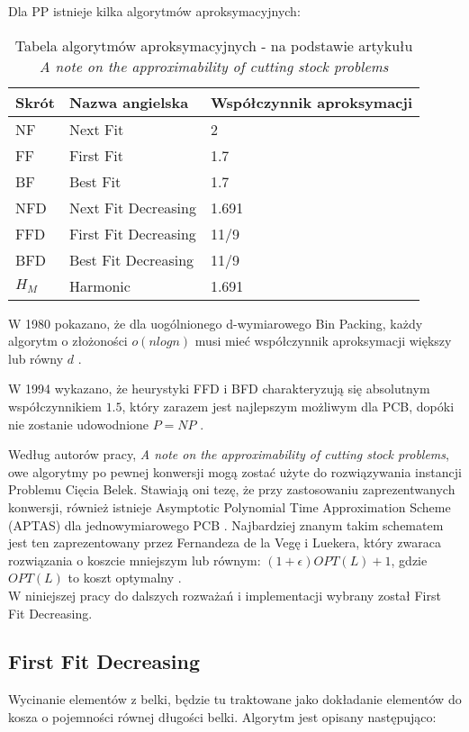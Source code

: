 Dla PP istnieje kilka algorytmów aproksymacyjnych: 

\begin{table}[!h]
\begin{center}
	\begin{tabular}{ |p{3cm}||p{5cm}|p{3cm}|  }
		\hline
		Skrót & Nazwa angielska & Współczynnik aproksymacji\\
		\hline
		NF   & Next Fit & 2\\
		FF & First Fit & 1.7\\
		BF & Best Fit & 1.7\\
		NFD & Next Fit Decreasing &  1.691\\
		FFD & First Fit Decreasing & 11/9\\
		BFD & Best Fit Decreasing & 11/9\\
		$H_M$ & Harmonic & 1.691\\	
		\hline
	\end{tabular}
	\caption{\label{APPROX_RATIOS}Tabela algorytmów aproksymacyjnych - na podstawie artykułu \textit{A note on the approximability of cutting stock problems} }
\end{center}
\end{table}

W 1980 pokazano, że dla uogólnionego d-wymiarowego Bin Packing, każdy algorytm o złożoności $o(nlogn)$ musi mieć współczynnik aproksymacji większy lub równy $d$ \cite{APPROX_RATIO}.

W 1994 wykazano, że heurystyki FFD i BFD charakteryzują się absolutnym współczynnikiem $1.5$, który zarazem jest najlepszym możliwym dla PCB, dopóki nie zostanie udowodnione $P=NP$ \cite{WORST_CASE_APPROX}.

Według autorów pracy, \textit{A note on the approximability of cutting stock problems}, owe algorytmy po pewnej konwersji mogą zostać użyte do rozwiązywania instancji Problemu Cięcia Belek. Stawiają oni tezę, że przy zastosowaniu zaprezentwanych konwersji, również istnieje Asymptotic Polynomial Time Approximation Scheme (APTAS) dla jednowymiarowego PCB \cite{NOTE_ON_APPROX}.
Najbardziej znanym takim schematem jest ten zaprezentowany przez Fernandeza de la Vegę i Luekera, który zwaraca rozwiązania o koszcie mniejszym lub równym: $(1+\epsilon)OPT(L) + 1$, gdzie $OPT(L)$ to koszt optymalny \cite{APTAS}. \\

W niniejszej pracy do dalszych rozważań i implementacji wybrany został First Fit Decreasing.

\subsection{First Fit Decreasing}  \label{approx_pseudocode}
Wycinanie elementów z belki, będzie tu traktowane jako dokładanie elementów do kosza o pojemności równej długości belki.
Algorytm jest opisany następująco:


